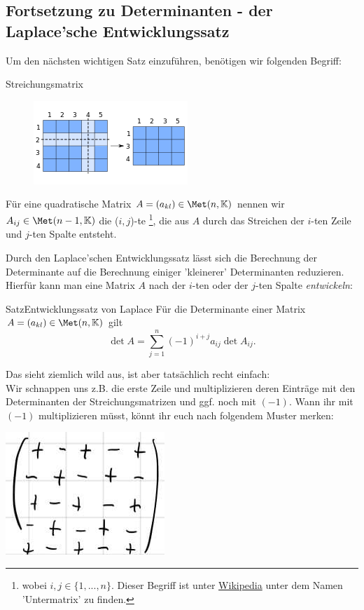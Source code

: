 \subsection{Fortsetzung zu Determinanten - der Laplace'sche Entwicklungssatz}
Um den nächsten wichtigen Satz einzuführen, benötigen wir folgenden Begriff:
\begin{Def}
{Streichungsmatrix}
\begin{figure}
 \vspace{-30pt}
\includegraphics[width=.35\textwidth]{Dateien/01/01Submatrix_qtl1.svg.png}
 \vspace{-15pt}
\end{figure}
Für eine quadratische Matrix $A=(a_{kl})\in\Met(n,\mathbb{K})$ nennen wir $A_{ij}\in\Met(n-1,\mathbb{K})$ die ($i,j$)-te \footnote{wobei $i,j\in\{1,...,n\}$. Dieser Begriff ist unter \href{https://de.wikipedia.org/wiki/Untermatrix}{Wikipedia} unter dem Namen 'Untermatrix' zu finden.}, die aus $A$ durch das Streichen der $i$-ten Zeile und $j$-ten Spalte entsteht.
\end{Def}
Durch den Laplace'schen Entwicklungssatz lässt sich die Berechnung der Determinante auf die Berechnung einiger 'kleinerer' Determinanten reduzieren.\\
Hierfür kann man eine Matrix $A$ nach der $i$-ten oder der $j$-ten Spalte \textit{entwickeln}:
\begin{Satz}{Satz}{Entwicklungssatz von Laplace}
Für die Determinante einer Matrix $A=(a_{kl})\in\Met(n,\mathbb{K})$ gilt
\begin{equation}
    \det A=\sum_{j=1}^n(-1)^{i+j}a_{ij}\det A_{ij}.
\end{equation}
\end{Satz}
Das sieht ziemlich wild aus, ist aber tatsächlich recht einfach:\\
Wir schnappen uns z.B. die erste Zeile und multiplizieren deren Einträge mit den Determinanten der Streichungsmatrizen und ggf. noch mit $(-1)$.
Wann ihr mit $(-1)$ multiplizieren müsst, könnt ihr euch nach folgendem Muster merken:
\begin{center}
    \includegraphics[width=.15\textwidth]{Dateien/01/01Laplacschema.jpg}
\end{center}
